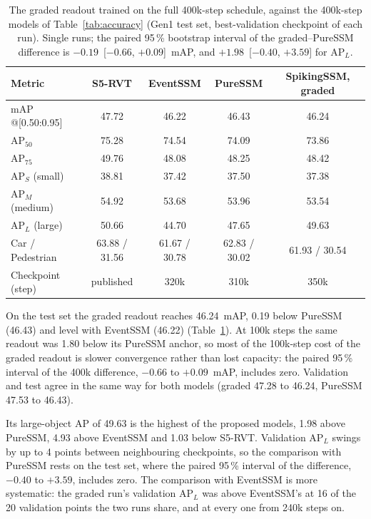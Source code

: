 \documentclass[11pt, a4paper]{report}
\begin{document}
\begin{table}[htbp]
\centering
\caption{The graded readout trained on the full 400k-step schedule, against the 400k-step models of
Table~\ref{tab:accuracy} (Gen1 test set, best-validation checkpoint of each run). Single runs; the paired
95\,\% bootstrap interval of the graded--PureSSM difference is $-0.19$~[$-0.66$, $+0.09$]~mAP, and
$+1.98$~[$-0.40$, $+3.59$] for $\mathrm{AP}_L$.}
\label{tab:spiking_400k}
\begin{tabular}{lcccc}
\toprule
\textbf{Metric} & \textbf{S5-RVT} & \textbf{EventSSM} & \textbf{PureSSM} & \textbf{SpikingSSM, graded} \\
\midrule
mAP @[0.50:0.95]        & 47.72 & 46.22 & 46.43 & 46.24 \\
$\mathrm{AP}_{50}$      & 75.28 & 74.54 & 74.09 & 73.86 \\
$\mathrm{AP}_{75}$      & 49.76 & 48.08 & 48.25 & 48.42 \\
$\mathrm{AP}_S$ (small) & 38.81 & 37.42 & 37.50 & 37.38 \\
$\mathrm{AP}_M$ (medium)& 54.92 & 53.68 & 53.96 & 53.54 \\
$\mathrm{AP}_L$ (large) & 50.66 & 44.70 & 47.65 & 49.63 \\
\midrule
Car / Pedestrian        & 63.88 / 31.56 & 61.67 / 30.78 & 62.83 / 30.02 & 61.93 / 30.54 \\
Checkpoint (step)       & published & 320k & 310k & 350k \\
\bottomrule
\end{tabular}
\end{table}

On the test set the graded readout reaches 46.24~mAP, 0.19 below PureSSM (46.43) and level with EventSSM
(46.22) (Table~\ref{tab:spiking_400k}). At 100k steps the same readout was 1.80 below its PureSSM anchor, so
most of the 100k-step cost of the graded readout is slower convergence rather than lost capacity: the
paired 95\,\% interval of the 400k difference, $-0.66$ to $+0.09$~mAP, includes zero. Validation and test agree in the
same way for both models (graded 47.28 to 46.24, PureSSM 47.53 to 46.43).

Its large-object AP of 49.63 is the highest of the proposed models, 1.98 above PureSSM, 4.93 above EventSSM
and 1.03 below S5-RVT. Validation $\mathrm{AP}_L$ swings by up to 4 points between neighbouring checkpoints, so
the comparison with PureSSM rests on the test set, where the paired 95\,\% interval of the difference,
$-0.40$ to $+3.59$, includes zero. The comparison with
EventSSM is more systematic: the graded run's validation $\mathrm{AP}_L$ was above EventSSM's at 16 of the 20
validation points the two runs share, and at every one from 240k steps on.
\end{document}
